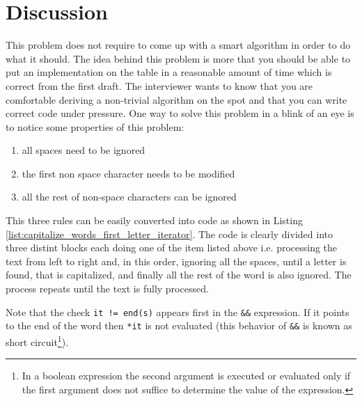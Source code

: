 \section{Discussion}
\label{capitalize_words_first_letter:sec:discussion}
This problem does not require to come up with a smart algorithm in order to do what it should. The idea behind this problem is more that you should be able to put an implementation on the table in a reasonable amount of time which is correct from the first draft. The interviewer wants to know that you are comfortable deriving a non-trivial algorithm on the spot and that you can write correct code under pressure.
One way to solve this problem in a blink of an eye is to notice some properties of this problem:

\begin{enumerate}
	\item  all spaces need to be ignored
    \item  the first non space character needs to be modified
    \item  all the rest of non-space characters can be ignored
\end{enumerate}

This three rules  can be easily converted into code as shown in Listing \ref{list:capitalize_words_first_letter_iterator}. The code is clearly divided into three distint blocks each doing one of the item listed above i.e. processing the text from left to right and, in this order, ignoring all the spaces, until a letter is found, that is capitalized, and finally all the rest of the word is also ignored. The process repeats until the text is fully processed. 



Note that the check \lstinline[columns=fixed]{it != end(s)} appears first in the \lstinline[columns=fixed]{&&} expression. If it points to the end of the word then \lstinline[columns=fixed]{*it} is not evaluated (this behavior of \lstinline[columns=fixed]{&&} is known as short circuit\footnote{In a boolean expression the second argument is executed or evaluated only if the first argument does not suffice to determine the value of the expression.}\cite{cit:wiki:shortcircuit}).

